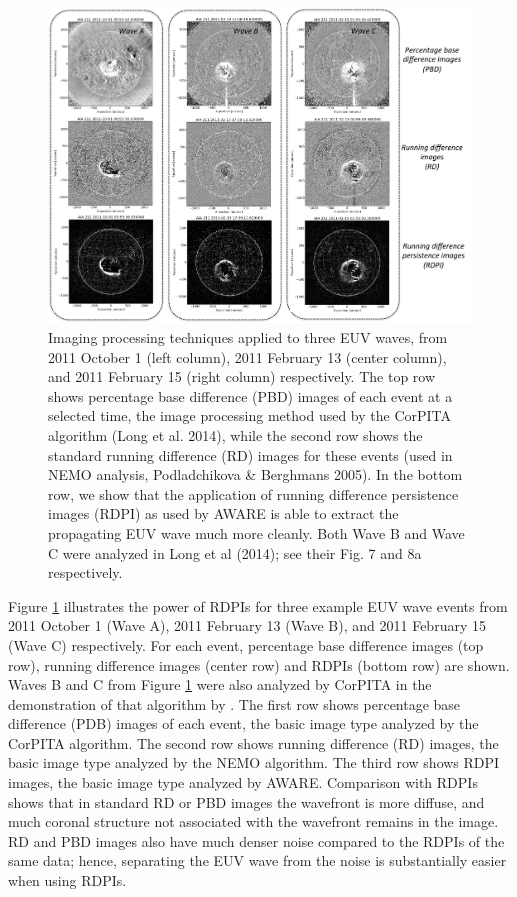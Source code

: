 \begin{figure}
\begin{center}
\includegraphics[width=16cm]{aware_rdpm_figure_v3.pdf}
\caption{Imaging processing techniques applied to three EUV waves, from 2011 October 1 (left column), 2011 February 13 (center column), and 2011 February 15 (right column) respectively. The top row shows percentage base difference (PBD) images of each event at a selected time, the image processing method used by the CorPITA algorithm (Long et al. 2014), while the second row shows the standard running difference (RD) images for these events (used in NEMO analysis, Podladchikova & Berghmans 2005). In the bottom row, we show that the application of running difference persistence images (RDPI) as used by AWARE is able to extract the propagating EUV wave much more cleanly. Both Wave B and Wave C were analyzed in Long et al (2014); see their Fig. 7 and 8a respectively.}
\label{rpdm_figure}
\end{center}
\end{figure}


 Figure \ref{rpdm_figure} illustrates the power of RDPIs for three example EUV wave events from 2011 October 1 (Wave A), 2011 February 13 (Wave B), and 2011 February 15 (Wave C) respectively. For each event, percentage base difference images (top row), running difference images (center row) and RDPIs (bottom row) are shown. Waves B and C from Figure \ref{rpdm_figure} were also analyzed by CorPITA in the demonstration of that algorithm by \citet{2014SoPh..289.3279L}.  The first row shows percentage base difference (PDB) images of each event, the basic image type analyzed by the CorPITA algorithm.  The second row shows running difference (RD) images, the basic image type analyzed by the NEMO algorithm.  The third row shows RDPI images, the basic image type analyzed by AWARE. Comparison with RDPIs shows that in standard RD or PBD images the wavefront is more diffuse, and much coronal structure not associated with the wavefront remains in the image. RD and PBD images also have much denser noise compared to the RDPIs of the same data; hence, separating the EUV wave from the noise is substantially easier when using RDPIs.   

